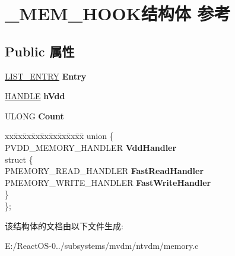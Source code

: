 \hypertarget{struct___m_e_m___h_o_o_k}{}\section{\+\_\+\+M\+E\+M\+\_\+\+H\+O\+O\+K结构体 参考}
\label{struct___m_e_m___h_o_o_k}
\subsection*{Public 属性}
\begin{DoxyCompactItemize}
\item 
\mbox{\label{struct___m_e_m___h_o_o_k_ae18c0b23a5551c359035d6143ec72076}} 
\hyperlink{struct___l_i_s_t___e_n_t_r_y}{L\+I\+S\+T\+\_\+\+E\+N\+T\+RY} {\bfseries Entry}
\item 
\mbox{\label{struct___m_e_m___h_o_o_k_ac92f82b8154594777e14af8206ce8e76}} 
\hyperlink{interfacevoid}{H\+A\+N\+D\+LE} {\bfseries h\+Vdd}
\item 
\mbox{\label{struct___m_e_m___h_o_o_k_aae80b9453d276e147748888533569eb4}} 
U\+L\+O\+NG {\bfseries Count}
\item 
\mbox{\label{struct___m_e_m___h_o_o_k_ad13eb9fb107518fb8f6f651126411f8f}} 
\begin{tabbing}
xx\=xx\=xx\=xx\=xx\=xx\=xx\=xx\=xx\=\kill
union \{\\
\>PVDD\_MEMORY\_HANDLER {\bfseries VddHandler}\\
\mbox{\label{union___m_e_m___h_o_o_k_1_1_0D3729_ab4b764bdf0e452098145651b010accd5}} 
\>struct \{\\
\>\>PMEMORY\_READ\_HANDLER {\bfseries FastReadHandler}\\
\>\>PMEMORY\_WRITE\_HANDLER {\bfseries FastWriteHandler}\\
\>\} \\
\}; \\

\end{tabbing}\end{DoxyCompactItemize}


该结构体的文档由以下文件生成\+:\begin{DoxyCompactItemize}
\item 
E\+:/\+React\+O\+S-\/0../subsystems/mvdm/ntvdm/memory.\+c\end{DoxyCompactItemize}

